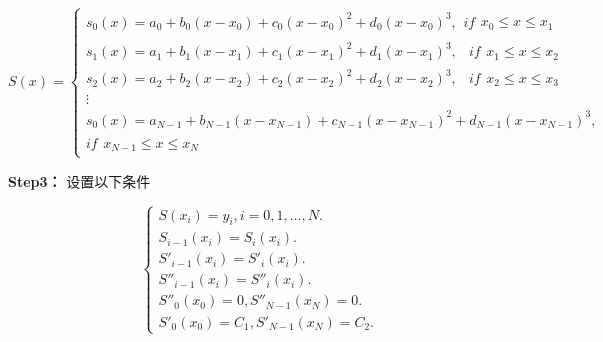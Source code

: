 \documentclass[withoutpreface,bwprint]{cumcmthesis}
\begin{document}
	\begin{equation}
		S(x) = \left\{ \begin{array}{l}
			{s_0}(x) = {a_0} + {b_0}(x - {x_0}) + {c_0}{(x - {x_0})^2} + {d_0}{(x - {x_0})^3},\begin{array}{*{20}{c}}
				{if\begin{array}{*{20}{c}}
						{{x_0} \le x \le {x_1}}
				\end{array}}
			\end{array}\\
			{s_1}(x) = {a_1} + {b_1}(x - {x_1}) + {c_1}{(x - {x_1})^2} + {d_1}{(x - {x_1})^3},\begin{array}{*{20}{c}}
				{}
			\end{array}if\begin{array}{*{20}{c}}
				{{x_1} \le x \le {x_2}}
			\end{array}\\
			{s_2}(x) = {a_2} + {b_2}(x - {x_2}) + {c_2}{(x - {x_2})^2} + {d_2}{(x - {x_2})^3},\begin{array}{*{20}{c}}
				{}
			\end{array}if\begin{array}{*{20}{c}}
				{{x_2} \le x \le {x_3}}
			\end{array}\\
			\vdots \\
			{s_0}(x) = {a_{N - 1}} + {b_{N - 1}}(x - {x_{N - 1}}) + {c_{N - 1}}{(x - {x_{N - 1}})^2} + {d_{N - 1}}{(x - {x_{N - 1}})^3},
			\\if\begin{array}{*{20}{c}}
				{{x_{N - 1}} \le x \le {x_N}}
			\end{array}
		\end{array} \right.
	\end{equation}
	
	\textbf{Step3：}	设置以下条件
	
\begin{equation}
	\label{eq:41}
	\left \{{\begin{matrix}S\left ({{{x}_{i}}}\right )={{y}_{i}},i=0,1,...,N.\\{{S}_{i-1}}\left ({{{x}_{i}}}\right )={{S}_{i}}({{x}_{i}}).\\{{S'}_{i-1}}({{x}_{i}})={{S'}_{i}}({{x}_{i}}).\\{{S''}_{i-1}}({{x}_{i}})={{S''}_{i}}({{x}_{i}}).\\{{S''}_{0}}({{x}_{0}})=0,{{S''}_{N-1}}({{x}_{N}})=0.\\{{S'}_{0}}({{x}_{0}})={{C}_{1}},{{S'}_{N-1}}({{x}_{N}})={{C}_{2}}.\end{matrix}}\right .
\end{equation}
	
\end{document}
